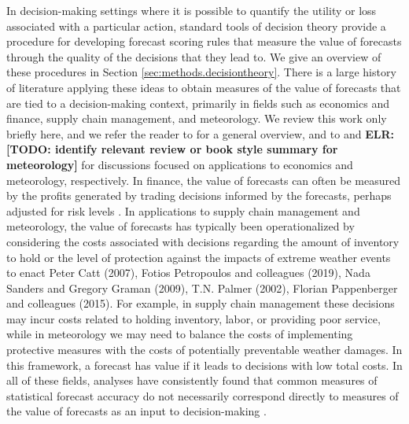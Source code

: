 \documentclass{article}
\def\elr#1{{\color{cyan}\textbf{ELR:[#1]}}}
\begin{document}
In decision-making settings where it is possible to quantify the utility or loss associated with a particular action, standard tools of decision theory provide a procedure for developing forecast scoring rules that measure the value of forecasts through the quality of the decisions that they lead to. We give an overview of these procedures in Section \ref{sec:methods.decisiontheory}. There is a large history of literature applying these ideas to obtain measures of the value of forecasts that are tied to a decision-making context, primarily in fields such as economics and finance, supply chain management, and meteorology. We review this work only briefly here, and we refer the reader to \cite{yardley2021utility_cost_forecasts} for a general overview, and to \cite{pesaran2002decision_based_eval} and \elr{TODO: identify relevant review or book style summary for meteorology} for discussions focused on applications to economics and meteorology, respectively. In finance, the value of forecasts can often be measured by the profits generated by trading decisions informed by the forecasts, perhaps adjusted for risk levels \cite[e.g.,][]{leitch1991economicForecastEval, cenesizoglu2012returnPredictionEconValue}. In applications to supply chain management and meteorology, the value of forecasts has typically been operationalized by considering the costs associated with decisions regarding the amount of inventory to hold or the level of protection against the impacts of extreme weather events to enact {Peter Catt (2007), Fotios Petropoulos and colleagues (2019), Nada Sanders and Gregory Graman (2009), T.N. Palmer (2002), Florian Pappenberger and colleagues (2015)}. For example, in supply chain management these decisions may incur costs related to holding inventory, labor, or providing poor service, while in meteorology we may need to balance the costs of implementing protective measures with the costs of potentially preventable weather damages. In this framework, a forecast has value if it leads to decisions with low total costs. In all of these fields, analyses have consistently found that common measures of statistical forecast accuracy do not necessarily correspond directly to measures of the value of forecasts as an input to decision-making \cite[e.g.,][]{leitch1991economicForecastEval, cenesizoglu2012returnPredictionEconValue}. %

\end{document}
